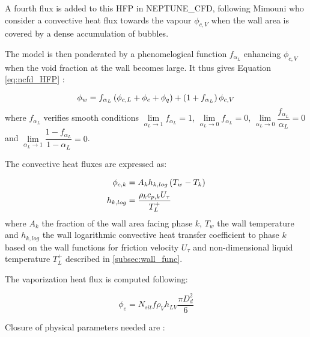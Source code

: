 A fourth flux is added to this HFP in NEPTUNE\_CFD, following Mimouni \etal\cite{mimouni_computational_2016} who consider a convective heat flux towards the vapour $\phi_{c,V}$ when the wall area is covered by a dense accumulation of bubbles. 

\npar

The model is then ponderated by a phenomelogical function $f_{\alpha_{L}}$ enhancing $\phi_{c,V}$ when the void fraction at the wall becomes large. It thus gives Equation \ref{eq:ncfd_HFP} :

\begin{equation}
\phi_{w}=f_{\alpha_{L}} \left( \phi_{c,L}+\phi_{e}+\phi_{q} \right) + \left( 1+f_{\alpha_{L}}  \right)\phi_{c,V}
\label{eq:ncfd_HFP}
\end{equation}
where $f_{\alpha_{L}}$ verifies smooth conditions $\lim\limits_{\alpha_{L} \to 1} f_{\alpha_{L}} = 1$, $\lim\limits_{\alpha_{L} \to 0} f_{\alpha_{L}} = 0$, $\lim\limits_{\alpha_{L} \to 0} \dfrac{f_{\alpha_{L}} }{ \alpha_{L}} = 0$ and $\lim\limits_{\alpha_{L} \to 1} \dfrac{ 1 - f_{\alpha_{L}} }{ 1 - \alpha_{L}} = 0$.

\npar
The convective heat fluxes are expressed as:

\begin{align}
\phi_{c,k} &=A_{k}h_{k,log}\parth{T_{w}-T_{k}}\\
%
h_{k,log} &=\frac{ \rho_{k}c_{p,k}{U_{\tau}}}{{T_{L}^{+}} }
\label{eq:ncfd_hfc}
\end{align}
where $A_{k}$ the fraction of the wall area facing phase $k$, $T_{w}$ the wall temperature and $h_{k,log}$ the wall logarithmic convective heat transfer coefficient to phase $k$ based on the wall functions for friction velocity $U_{\tau}$ and non-dimensional liquid temperature $T_{L}^{+}$ described in \ref{subsec:wall_func}.

\npar
The vaporization heat flux is computed following:

\begin{equation}
\phi_{e}=N_{sit}f\rho_{V}h_{LV}\frac{\pi D_{d}^{2}}{6}
\label{eq:phie_NCFD}
\end{equation}


Closure of physical parameters needed are :


